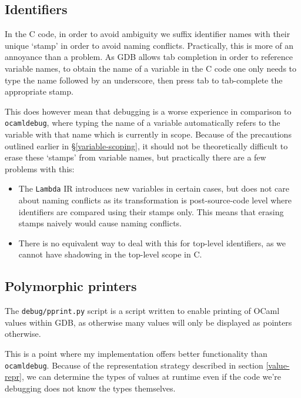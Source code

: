 \subsection{Identifiers}

In the C code, in order to avoid ambiguity we suffix identifier names with 
their unique `stamp' in order to avoid naming conflicts. Practically, this is 
more of an annoyance than a problem. As GDB allows tab completion in order to 
reference variable names, to obtain the name of a variable in the C code one 
only needs to type the name followed by an underscore, then press tab to 
tab-complete the appropriate stamp.

This does however mean that debugging is a worse experience in comparison to
\texttt{ocamldebug}, where typing the name of a variable automatically refers to
the variable with that name which is currently in scope. Because of the
precautions outlined earlier in \S\ref{variable-scoping}, it should not be
theoretically difficult to erase these `stamps' from variable names, but
practically there are a few problems with this:

\begin{itemize}
    \item The \texttt{Lambda} IR introduces new variables in certain cases, but 
    does not care about naming conflicts as its transformation is 
    post-source-code level where identifiers are compared using their stamps 
    only. This means that erasing stamps naively would cause naming conflicts.
    \item There is no equivalent way to deal with this for top-level 
    identifiers, as we cannot have shadowing in the top-level scope in C.
\end{itemize}

\subsection{Polymorphic printers}

The \texttt{debug/pprint.py} script is a script written to enable printing of 
OCaml values within GDB, as otherwise many values will only be displayed as 
pointers otherwise.

This is a point where my implementation offers better functionality than 
\texttt{ocamldebug}. Because of the representation strategy described in section
\ref{value-repr}, we can determine the types of values at runtime even if the 
code we're debugging does not know the types themselves.

